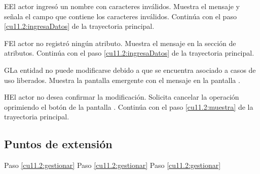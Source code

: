  \begin{UCtrayectoriaA}{E}{El actor ingresó un nombre con caracteres inválidos.}
    \UCpaso[\UCsist] Muestra el mensaje  y señala el campo que contiene los caracteres inválidos.
    \UCpaso[] Continúa con el paso \ref{cu11.2:ingresaDatos} de la trayectoria principal.
 \end{UCtrayectoriaA}
 \begin{UCtrayectoriaA}{F}{El actor no registró ningún atributo.}
    \UCpaso[\UCsist] Muestra el mensaje  en la sección de atributos.
    \UCpaso[] Continúa con el paso \ref{cu11.2:ingresaDatos} de la trayectoria principal.
 \end{UCtrayectoriaA}
 \begin{UCtrayectoriaA}{G}{La entidad no puede modificarse debido a que se encuentra asociado a casos de uso liberados.}
    \UCpaso[\UCsist] Muestra la pantalla emergente con el mensaje  en la pantalla .
 \end{UCtrayectoriaA}
 \begin{UCtrayectoriaA}{H}{El actor no desea confirmar la modificación.}
    \UCpaso[\UCactor] Solicita cancelar la operación oprimiendo el botón  de la pantalla .
    \UCpaso[] Continúa con el paso \ref{cu11.2:muestra} de la trayectoria principal.
 \end{UCtrayectoriaA}
\subsection{Puntos de extensión}
 
	{Paso \ref{cu11.2:gestionar}}
	{}
	{Paso \ref{cu11.2:gestionar}}
	{}	
	{Paso \ref{cu11.2:gestionar}}
	{}
